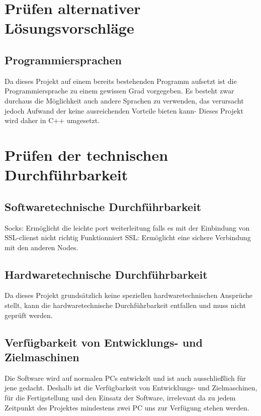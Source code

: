 \documentclass[a4paper,12pt]{scrreprt}
\begin{document}
	\section{Pr\"ufen alternativer L\"osungsvorschl\"age}
	
		\subsection{Programmiersprachen}
		
	Da dieses Projekt auf einem bereits bestehenden Programm aufsetzt ist die Programmiersprache zu einem gewissen Grad vorgegeben. Es besteht zwar durchaus die Möglichkeit auch andere Sprachen zu verwenden, das verursacht jedoch Aufwand der keine ausreichenden Vorteile bieten kann-
	Dieses Projekt wird daher in C++ umgesetzt.
	
		
		
		
			
	\section{Pr\"ufen der technischen Durchf\"uhrbarkeit}
		
		\subsection{Softwaretechnische Durchf\"uhrbarkeit}
		Socks: Ermöglicht die leichte port weiterleitung falls es mit der Einbindung von SSL-clienst nicht richtig Funktionniert
		SSL: Ermöglicht eine sichere Verbindung mit den anderen Nodes.
		
			
		\subsection{Hardwaretechnische Durchf\"uhrbarkeit}
			
		Da dieses Projekt grundsätzlich keine speziellen hardwaretechnischen Ansprüche stellt, 
		kann die hardwaretechnische Durchführbarkeit entfallen und muss nicht geprüft werden.
		
			
		\subsection{Verfügbarkeit von Entwicklungs- und Zielmaschinen}
			
	Die Software wird auf normalen PCs entwickelt und ist auch ausschließlich für jene gedacht. Deshalb ist die Verfügbarkeit von Entwicklungs- und Zielmaschinen, für die Fertigstellung und den Einsatz der Software, irrelevant da zu jedem Zeitpunkt des Projektes mindestens zwei PC uns zur Verfügung stehen werden.
			
\end{document}
